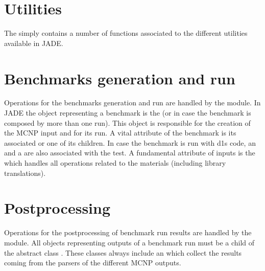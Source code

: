 \documentclass[letterpaper,10pt,english]{sphinxmanual}
\begin{document}
\section{Utilities}
\label{\detokenize{api/general:utilities}}
The  simply contains a number of functions associated to the
different utilities available in JADE.




{\hyperref[\detokenize{usage/utilities:uty}]{}}




\section{Benchmarks generation and run}
\label{\detokenize{api/general:benchmarks-generation-and-run}}
Operations for the benchmarks generation and run are handled by the 
module.
In JADE the object representing a benchmark is the {\hyperref[\detokenize{api/inputgeneration:testob}]{}} (or {\hyperref[\detokenize{api/inputgeneration:multitestob}]{}}
in case the benchmark is composed by more than one run). This object is responsible
for the creation of the MCNP input and for its run. A vital attribute of the benchmark
is its associated {\hyperref[\detokenize{api/inputgeneration:inputob}]{}} or one of its children. In case the benchmark is run
with d1s code, an {\hyperref[\detokenize{api/inputgeneration:irradfileob}]{}} and a {\hyperref[\detokenize{api/inputgeneration:reacfileob}]{}} are also associated with the
test. A fundamental attribute of inputs is the {\hyperref[\detokenize{api/inputgeneration:matcardob}]{}} which handles all operations
related to the materials (including library translations).


\section{Post\sphinxhyphen{}processing}
\label{\detokenize{api/general:post-processing}}
Operations for the post\sphinxhyphen{}processing of benchmark run results are handled by the
 module.
All objects representing outputs of a benchmark run must be a child of the abstract class
{\hyperref[\detokenize{api/postprocessing:abstractoutputob}]{}}. These classes always include an {\hyperref[\detokenize{api/postprocessing:mcnpoutputob}]{}} which collect
the results coming from the parsers of the different MCNP outputs.
\end{document}
